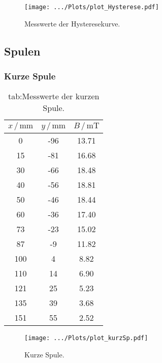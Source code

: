 \begin{figure}
    \centering
    \texttt{[image: .../Plots/plot\_Hysterese.pdf]}
    \caption{Messwerte der Hysteresekurve.}
    \label{fig:hyst}
\end{figure}
\pagebreak

\subsection{Spulen}
    \subsubsection{Kurze Spule}
    \begin{table}
    \centering
    \caption{tab:Messwerte der kurzen Spule.}
    \label{tab:kurzSp}
        \begin{tabular}{S[table-format=3.0] S[table-format=2.0] S[table-format=2.2]}
            \toprule
            {$x\,/\,\mathrm{mm}$} & {$y\,/\,\mathrm{mm}$} & {$B\,/\,\mathrm{mT}$}\\
               & -96   & 13.71 \\
            15  & -81   & 16.68 \\
            30  & -66   & 18.48 \\
            40  & -56   & 18.81 \\
            50  & -46   & 18.44 \\
            60  & -36   & 17.40 \\
            73  & -23   & 15.02 \\
            87  & -9    & 11.82 \\
            100 & 4     & 8.82  \\
            110 & 14    & 6.90  \\
            121 & 25    & 5.23  \\
            135 & 39    & 3.68  \\
            151 & 55    & 2.52  \\
            \bottomrule
        \end{tabular}
    \end{table}
    \begin{figure}
        \centering
        \texttt{[image: .../Plots/plot\_kurzSp.pdf]}
        \caption{Kurze Spule.}
        \label{fig:kurz}
    \end{figure}
    \pagebreak
